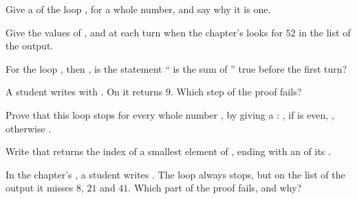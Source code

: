\begin{exercise}[$\star$]\label{exo:g11:proving-algorithms-correct:2}
Give a  of the loop , for  a whole number, and say why it is one.
\end{exercise}

\begin{exercise}[$\star$]\label{exo:g11:proving-algorithms-correct:3}
Give the values of ,  and  at each turn when the chapter's  looks for $52$
in the list of the output.
\end{exercise}

\begin{exercise}[$\star$]\label{exo:g11:proving-algorithms-correct:4}
For the loop , then , is the statement `` is the sum
of '' true before the first turn?
\end{exercise}

\begin{exercise}[$\star$]\label{exo:g11:proving-algorithms-correct:5}
A student writes  with . On \code{[4, 9, 2, 11]} it returns $9$.
Which step of the proof fails?
\end{exercise}

\begin{exercise}[$\star\star$]\label{exo:g11:proving-algorithms-correct:6}
Prove that this loop stops for every whole number , by giving a : , if  is
even, , otherwise .
\end{exercise}

\begin{exercise}[$\star\star$]\label{exo:g11:proving-algorithms-correct:7}
Write  that returns the index of a smallest element of , ending with an
 of its .
\end{exercise}

\begin{exercise}[$\star\star$]\label{exo:g11:proving-algorithms-correct:8}
In the chapter's , a student writes . The loop always stops, but on the list of the
output it misses $8$, $21$ and $41$. Which part of the proof fails, and why?
\end{exercise}

